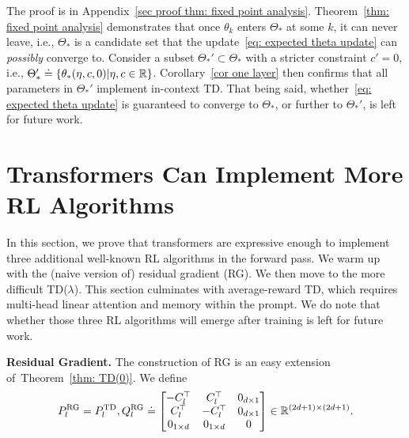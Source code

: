 \documentclass{article}
\newcommand{\R}{\mathbb{R}}
\newcommand{\td}{\text{TD}}
\newcommand{\rg}{\text{RG}}
\begin{document}
The proof is in Appendix~\ref{sec proof thm: fixed point analysis}. Theorem~\ref{thm: fixed point analysis} demonstrates that once $\theta_k$ enters $\Theta_*$ at some $k$,
it can never leave,
i.e.,
$\Theta_*$ is a candidate set that the update~\eqref{eq: expected theta update} can \emph{possibly} converge to.
Consider a subset $\Theta_*' \subset \Theta_*$ with a stricter constraint $c' = 0$,
i.e., $\Theta_*' \doteq \qty{\theta_*(\eta, c, 0) | \eta, c \in \R}$.
Corollary~\ref{cor one layer} then confirms that all parameters in $\Theta_*'$ implement in-context TD.
That being said,
whether~\eqref{eq: expected theta update} is guaranteed to converge to $\Theta_*$,
or further to $\Theta_*'$,
is left for future work. 




\section{Transformers Can Implement More RL Algorithms}
In this section, 
we prove that transformers are expressive enough
to implement three additional well-known RL algorithms in the forward pass.
We warm up with the (naive version of) residual gradient (RG).
We then move to the more difficult TD($\lambda$).
This section culminates with average-reward TD,
which requires multi-head linear attention and memory within the prompt.
We do note that whether those three RL algorithms will emerge after training is left for future work.

\textbf{Residual Gradient.}
The construction of RG is an easy extension of~Theorem~\ref{thm: TD(0)}. 
We define
\begin{align}
    P_l^{\rg} = P_l^{\td}, Q_l^{\rg} 
    \doteq \mqty[-C_l^\top & C_l^\top & 0_{d \times 1} \\
                 C_l^\top  & -C_l^\top & 0_{d \times 1} \\ 
                 0_{1 \times d} & 0_{1 \times d} & 0] \in \R^{(2d+1) \times (2d+1)}. \label{eq: P and Q def RG}
\end{align}
\end{document}
